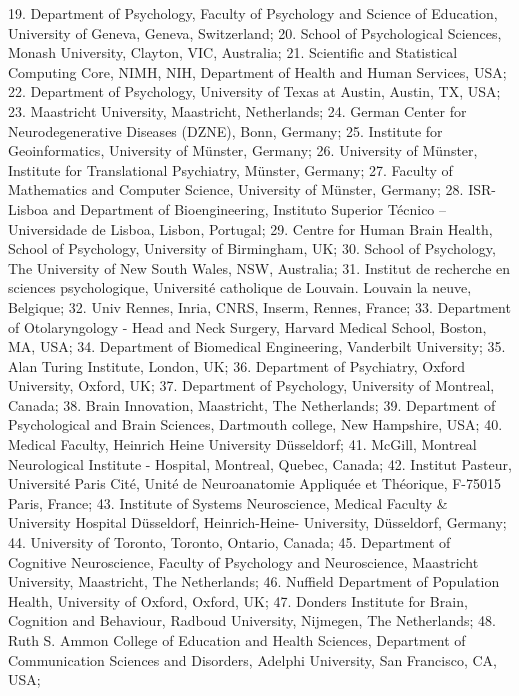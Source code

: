 \documentclass[10pt,a4paper,twocolumns]{proc}
\begin{document}
{19. Department of Psychology, Faculty of Psychology and Science of Education, University of Geneva, Geneva, Switzerland; %
20. School of Psychological Sciences, Monash University, Clayton, VIC, Australia; %
21. Scientific and Statistical Computing Core, NIMH, NIH, Department of Health and Human Services, USA; %
22. Department of Psychology, University of Texas at Austin, Austin, TX, USA; %
23. Maastricht University, Maastricht, Netherlands; %
24. German Center for Neurodegenerative Diseases (DZNE), Bonn, Germany; %
25. Institute for Geoinformatics, University of Münster, Germany; %
26. University of Münster, Institute for Translational Psychiatry, Münster, Germany; %
27. Faculty of Mathematics and Computer Science, University of Münster, Germany; %
28. ISR-Lisboa and Department of Bioengineering, Instituto Superior Técnico – Universidade de Lisboa, Lisbon, Portugal; %
29. Centre for Human Brain Health, School of Psychology, University of Birmingham, UK; %
30. School of Psychology, The University of New South Wales, NSW, Australia; %
31. Institut de recherche en sciences psychologique, Université catholique de Louvain. Louvain la neuve, Belgique; %
32. Univ Rennes, Inria, CNRS, Inserm, Rennes, France; %
33. Department of Otolaryngology - Head and Neck Surgery, Harvard Medical School, Boston, MA, USA; %
34. Department of Biomedical Engineering, Vanderbilt University; %
35. Alan Turing Institute, London, UK; %
36. Department of Psychiatry, Oxford University, Oxford, UK; %
37. Department of Psychology, University of Montreal, Canada; %
38. Brain Innovation, Maastricht, The Netherlands; %
39. Department of Psychological and Brain Sciences, Dartmouth college, New Hampshire, USA; %
40. Medical Faculty, Heinrich Heine University Düsseldorf; %
41. McGill, Montreal Neurological Institute - Hospital, Montreal, Quebec, Canada; %
42. Institut Pasteur, Université Paris Cité, Unité de Neuroanatomie Appliquée et Théorique, F-75015 Paris, France; %
43. Institute of Systems Neuroscience, Medical Faculty & University Hospital Düsseldorf, Heinrich-Heine- University, Düsseldorf, Germany; %
44. University of Toronto, Toronto, Ontario, Canada; %
45. Department of Cognitive Neuroscience, Faculty of Psychology and Neuroscience, Maastricht University, Maastricht, The Netherlands; %
46. Nuffield Department of Population Health, University of Oxford, Oxford, UK; %
47. Donders Institute for Brain, Cognition and Behaviour, Radboud University, Nijmegen, The Netherlands; %
48. Ruth S. Ammon College of Education and Health Sciences, Department of Communication Sciences and Disorders, Adelphi University, San Francisco, CA, USA; %
}
\end{document}
